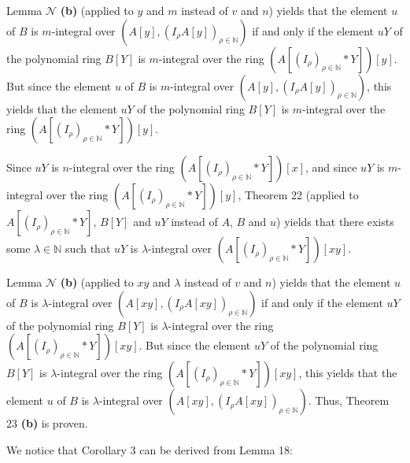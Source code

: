 \documentclass[12pt,final,notitlepage,onecolumn]{article}%
\begin{document}
Lemma $\mathcal{N}$ \textbf{(b)} (applied to $y$ and $m$ instead of $v$ and
$n$) yields that the element $u$ of $B$ is $m$-integral over $\left(  A\left[
y\right]  ,\left(  I_{\rho}A\left[  y\right]  \right)  _{\rho\in\mathbb{N}%
}\right)  $ if and only if the element $uY$ of the polynomial ring $B\left[
Y\right]  $ is $m$-integral over the ring $\left(  A\left[  \left(  I_{\rho
}\right)  _{\rho\in\mathbb{N}}\ast Y\right]  \right)  \left[  y\right]  $. But
since the element $u$ of $B$ is $m$-integral over $\left(  A\left[  y\right]
,\left(  I_{\rho}A\left[  y\right]  \right)  _{\rho\in\mathbb{N}}\right)  $,
this yields that the element $uY$ of the polynomial ring $B\left[  Y\right]  $
is $m$-integral over the ring $\left(  A\left[  \left(  I_{\rho}\right)
_{\rho\in\mathbb{N}}\ast Y\right]  \right)  \left[  y\right]  $.

Since $uY$ is $n$-integral over the ring $\left(  A\left[  \left(  I_{\rho
}\right)  _{\rho\in\mathbb{N}}\ast Y\right]  \right)  \left[  x\right]  $, and
since $uY$ is $m$-integral over the ring $\left(  A\left[  \left(  I_{\rho
}\right)  _{\rho\in\mathbb{N}}\ast Y\right]  \right)  \left[  y\right]  $,
Theorem 22 (applied to $A\left[  \left(  I_{\rho}\right)  _{\rho\in\mathbb{N}%
}\ast Y\right]  $, $B\left[  Y\right]  $ and $uY$ instead of $A$, $B$ and $u$)
yields that there exists some $\lambda\in\mathbb{N}$ such that $uY$ is
$\lambda$-integral over $\left(  A\left[  \left(  I_{\rho}\right)  _{\rho
\in\mathbb{N}}\ast Y\right]  \right)  \left[  xy\right]  $.

Lemma $\mathcal{N}$ \textbf{(b)} (applied to $xy$ and $\lambda$ instead of $v$
and $n$) yields that the element $u$ of $B$ is $\lambda$-integral over
$\left(  A\left[  xy\right]  ,\left(  I_{\rho}A\left[  xy\right]  \right)
_{\rho\in\mathbb{N}}\right)  $ if and only if the element $uY$ of the
polynomial ring $B\left[  Y\right]  $ is $\lambda$-integral over the ring
$\left(  A\left[  \left(  I_{\rho}\right)  _{\rho\in\mathbb{N}}\ast Y\right]
\right)  \left[  xy\right]  $. But since the element $uY$ of the polynomial
ring $B\left[  Y\right]  $ is $\lambda$-integral over the ring $\left(
A\left[  \left(  I_{\rho}\right)  _{\rho\in\mathbb{N}}\ast Y\right]  \right)
\left[  xy\right]  $, this yields that the element $u$ of $B$ is $\lambda
$-integral over $\left(  A\left[  xy\right]  ,\left(  I_{\rho}A\left[
xy\right]  \right)  _{\rho\in\mathbb{N}}\right)  $. Thus, Theorem 23
\textbf{(b)} is proven.

We notice that Corollary 3 can be derived from Lemma 18:
\end{document}
